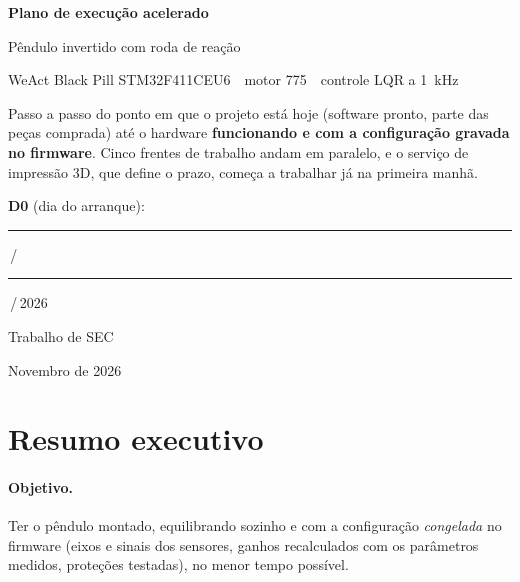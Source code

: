 \documentclass[11pt,a4paper]{article}
\newcommand{\linha}[1][2.6cm]{\rule{#1}{0.4pt}}
\begin{document}
\hypersetup{pageanchor=false}
\begin{titlepage}
  \centering
  \vspace*{1.6cm}
  {\sffamily\bfseries\color{azul!80!black}\Huge Plano de execução acelerado\par}
  \vspace{6mm}
  {\Large Pêndulo invertido com roda de reação\par}
  \vspace{2mm}
  {\large WeAct Black Pill STM32F411CEU6 \,\textbullet\, motor 775 \,\textbullet\,
    controle LQR a \qty{1}{\kilo\hertz}\par}
  \vspace{1.6cm}
  \begin{tcolorbox}[enhanced, width=0.84\textwidth, colback=azul!5,
      colframe=azul!60!black, boxrule=0.6pt, arc=2pt]
    \centering\small
    Passo a passo do ponto em que o projeto está hoje (software pronto, parte das peças
    comprada) até o hardware \textbf{funcionando e com a configuração gravada no
    firmware}. Cinco frentes de trabalho andam em paralelo, e o serviço de impressão 3D,
    que define o prazo, começa a trabalhar já na primeira manhã.
  \end{tcolorbox}
  \vfill
  {\large \textbf{D0} (dia do arranque):\enspace
    \linha[1.2cm]\,/\,\linha[1.2cm]\,/\,2026\par}
  \vspace{1.4cm}
  {\large Trabalho de SEC\par}
  \vspace{2mm}
  Novembro de 2026
\end{titlepage}
\hypersetup{pageanchor=true}

\tableofcontents
\newpage

\section{Resumo executivo}
\label{sec:resumo}

\paragraph{Objetivo.} Ter o pêndulo montado, equilibrando sozinho e com a configuração
\emph{congelada} no firmware (eixos e sinais dos sensores, ganhos recalculados com os
parâmetros medidos, proteções testadas), no menor tempo possível.
\end{document}
